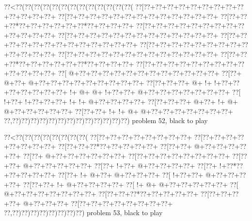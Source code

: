 \vbox{\vbox{\goo
\0??<\0??(\0??(\0??(\0??(\0??(\0??(\0??(\0??(\0??(\0??(\0??(\0??(\0??(
\0??[\0??+\0??+\0??+\0??+\0??+\0??+\0??+\0??+\0??+\0??+\0??+\0??+\0??+
\0??[\0??+\0??+\0??+\0??+\0??+\0??+\0??+\0??+\0??+\0??+\0??+\0??+\0??+
\0??[\0??+\0??+\0??*\0??+\0??+\0??+\0??+\0??+\0??*\0??+\0??+\0??+\0??+
\0??[\0??+\0??+\0??+\0??+\0??+\0??+\0??+\0??+\0??+\0??+\0??+\0??+\0??+
\0??[\0??+\0??+\0??+\0??+\0??+\0??+\0??+\0??+\0??+\0??+\0??+\0??+\0??+
\0??[\0??+\0??+\0??+\0??+\0??+\0??+\0??+\0??+\0??+\0??+\0??+\0??+\0??+
\0??[\0??+\0??+\0??+\0??+\0??+\0??+\0??+\0??+\0??+\0??+\0??+\0??+\0??+
\0??[\0??+\0??+\0??+\0??+\0??+\0??+\0??+\0??+\0??+\0??+\0??+\0??+\0??+
\0??[\0??+\0??+\0??*\0??+\0??+\0??+\0??+\0??+\0??*\0??+\0??+\0??+\0??+
\0??[\0??+\0??+\0??+\0??+\0??+\0??+\0??+\0??+\0??+\0??+\0??+\0??+\0??+
\0??[\- @+\0??+\0??+\0??+\0??+\0??+\0??+\0??+\0??+\0??+\0??+\0??+\0??+
\0??[\0??+\- @+\0??+\- @+\0??+\0??+\0??+\0??+\0??+\0??+\0??+\0??+\0??+
\0??[\0??+\0??+\0??+\- @+\- !+\- !+\0??+\0??+\0??+\0??+\0??+\0??+\0??+
\- !+\- @+\- @+\- !+\0??+\0??+\- @+\0??+\0??+\0??+\0??+\0??+\0??+\0??+
\0??[\- !+\0??+\- !+\0??+\0??+\0??+\- !+\- !+\- @+\0??+\0??+\0??+\0??+
\0??[\0??+\0??+\0??+\- @+\0??+\- !+\- @+\- @+\0??+\0??+\0??+\0??+\0??+
\0??[\0??+\0??+\- !+\- !+\- @+\- @+\0??+\0??+\0??+\0??+\0??+\0??+\0??+
\0??,\0??)\0??)\0??)\0??)\0??)\0??)\0??)\0??)\0??)\0??)\0??)\0??)\0??)
}
\hfil problem 52, black to play\hfil\break
}

\vbox{\vbox{\goo
\0??<\0??(\0??(\0??(\0??(\0??(\0??(\0??(\0??(
\0??[\0??+\0??+\0??+\0??+\0??+\0??+\0??+\0??+
\0??[\0??+\0??+\0??+\0??+\0??+\0??+\0??+\0??+
\0??[\0??+\0??+\0??*\0??+\0??+\0??+\0??+\0??+
\0??[\0??+\0??+\- @+\0??+\0??+\0??+\0??+\0??+
\0??[\0??+\- @+\0??+\0??+\0??+\0??+\0??+\0??+
\0??[\0??+\0??+\0??+\0??+\0??+\0??+\0??+\0??+
\0??[\0??+\0??+\- @+\0??+\0??+\0??+\0??+\0??+
\0??[\0??+\- !+\0??+\- @+\0??+\0??+\0??+\0??+
\0??[\0??+\- !+\0??*\0??+\0??+\0??+\0??+\0??+
\0??[\0??+\- !+\- @+\0??+\- @+\0??+\0??+\0??+
\0??[\- !+\0??+\0??+\- @+\0??+\0??+\0??+\0??+
\0??[\0??+\0??+\- !+\- @+\0??+\0??+\0??+\0??+
\0??[\- !+\- @+\- @+\0??+\0??+\0??+\0??+\0??+
\0??[\- @+\0??+\0??+\0??+\0??+\0??+\0??+\0??+
\0??[\0??+\0??+\0??*\0??+\0??+\0??+\0??+\0??+
\0??[\0??+\0??+\0??+\0??+\- @+\0??+\0??+\0??+
\0??[\0??+\0??+\0??+\0??+\0??+\0??+\0??+\0??+
\0??,\0??)\0??)\0??)\0??)\0??)\0??)\0??)\0??)
}
\hfil problem 53, black to play\hfil\break
}

